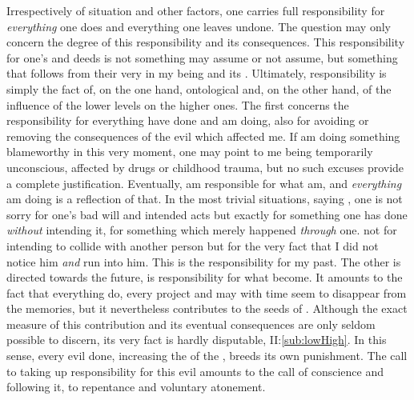 Irrespectively of situation and other factors, one carries full 
responsibility for {\em everything} one does and everything one leaves undone.
The question may only concern the degree of this responsibility and its
consequences.
%
This  responsibility for one's  and deeds is not something
 may assume or not assume, but something that follows from their very
 in my being and its .  Ultimately, responsibility
is simply the fact of, on the one hand, ontological  and, on the
other hand, of the influence of the lower levels on the higher ones. The first
 concerns the  responsibility for everything  have
done and am doing, also for avoiding or removing the consequences of the evil
which affected me. If  am doing something blameworthy in this very moment,
one may point to me being temporarily unconscious, affected by drugs or
childhood trauma, but no such excuses provide a complete justification.
Eventually,  am responsible for what  am, and {\em everything}
 am doing is a reflection of that. In the most trivial situations, saying
, one is not sorry for one's bad will and intended acts but
exactly for something one has done {\em without} intending it, for something
which merely happened {\em through} one.  not for intending to
collide with another person but for the very fact that I did not notice him {\em
  and} run into him.  This is the  responsibility for my
past. The other  is directed towards the future, is
responsibility for what  become. It amounts to the fact that everything
 do, every  project and  may with time seem to
disappear from the  memories, but it nevertheless contributes to the
 seeds of . Although the exact measure of this
contribution and its eventual consequences are only seldom possible to discern,
its very fact is hardly disputable, II:\ref{sub:lowHigh}.  In this sense, every
evil done, increasing the  of the , breeds its own
punishment. The call to taking up responsibility for this evil amounts to the
call of conscience and following it, to repentance and voluntary atonement.

